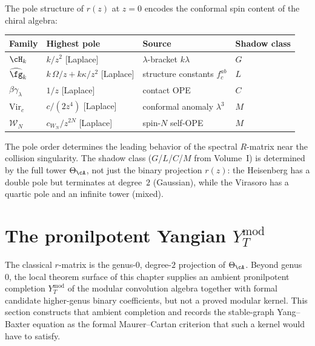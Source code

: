 \begin{remark}
The pole structure of $r(z)$ at $z = 0$ encodes the conformal
spin content of the chiral algebra:
\begin{center}
\small
\renewcommand{\arraystretch}{1.15}
\begin{tabular}{llll}
\textbf{Family} & \textbf{Highest pole} & \textbf{Source} &
\textbf{Shadow class} \\
\hline
$\cH_k$ & $k/z^2$ [Laplace] & $\lambda$-bracket $k\lambda$ & $G$ \\
$\widehat{\fg}_k$ & $k\,\Omega/z + k\kappa/z^2$ [Laplace] & structure constants $f^{ab}_c$ & $L$ \\
$\beta\gamma_\lambda$ & $1/z$ [Laplace] & contact OPE & $C$ \\
$\mathrm{Vir}_c$ & $c/(2z^4)$ [Laplace] & conformal anomaly $\lambda^3$ & $M$ \\
$\mathcal{W}_N$ & $c_{W_N}/z^{2N}$ [Laplace] & spin-$N$ self-OPE & $M$ \\
\end{tabular}
\end{center}
The pole order determines the leading behavior of the spectral
$R$-matrix near the collision singularity. The shadow class
($G$/$L$/$C$/$M$ from Volume~I) is determined by the full tower
$\Theta_\cA$, not just the binary projection $r(z)$: the
Heisenberg has a double pole but terminates at degree~$2$
(Gaussian), while the Virasoro has a quartic pole and an infinite
tower (mixed).
\end{remark}



\section{The pronilpotent Yangian $Y_T^{\mathrm{mod}}$}

The classical $r$-matrix is the genus-$0$, degree-$2$ projection of
$\Theta_\cA$. Beyond genus~$0$, the local theorem surface of this
chapter supplies an ambient pronilpotent completion
$Y_T^{\mathrm{mod}}$ of the modular convolution algebra together with
formal candidate higher-genus binary coefficients, but not a proved
modular kernel. This section constructs that ambient completion and
records the stable-graph Yang--Baxter equation as the formal
Maurer--Cartan criterion that such a kernel would have to satisfy.

